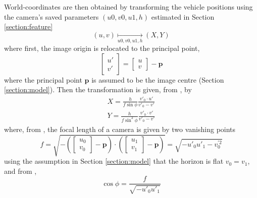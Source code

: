 World-coordinates are then obtained by transforming the vehicle positions using the camera's saved parameters $(u0,v0,u1,h)$ estimated in Section \ref{section:feature}
$$(u,v) \underset{u0,v0,u1,h}{\operatorname{\mapsto}}(X,Y)$$
where first, the image origin is relocated to the principal point, 
\begin{equation}
\begin{bmatrix}u'\\v' \end{bmatrix}=\begin{bmatrix}u\\v \end{bmatrix}-\mathbf{p}
\end{equation}
where the principal point $\mathbf{p}$ is assumed to be the image centre (Section \ref{section:model}).
Then the transformation is given, from \cite{schoepflin}, by
\begin{gather}
\label{eq:X}
X=\frac{h}{f\sin{\phi}} \frac{v'_0\cdot u'}{v'_0-v'}\\
\label{eq:Y}
Y=\frac{h}{f\sin^2{\phi}} \frac{v'_0\cdot v'}{v'_0-v'}
\end{gather}
where, from \cite{dubska}, the focal length of a camera is given by two vanishing points
\begin{equation}
f=\sqrt{-(\begin{bmatrix}u_0\\v_0 \end{bmatrix}-\mathbf{p})\cdot (\begin{bmatrix}u_1\\v_1 \end{bmatrix}-\mathbf{p})}
=\sqrt{-u'_0 u'_1 - v^{\prime 2}_0}
\end{equation}
using the assumption in Section \ref{section:model} that the horizon is flat $v_0=v_1$, 
and from \cite{schoepflin},
\begin{equation}
\cos{\phi}=\frac{f}{\sqrt{-u'_0 u'_1}}
\end{equation}